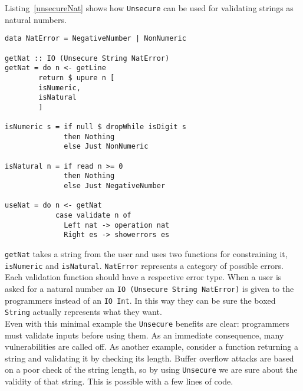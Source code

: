 Listing~\ref{unsecureNat} shows how \texttt{Unsecure} can be used for validating strings as natural numbers.
\begin{lstlisting}[label={unsecureNat}, breaklines=true, caption={Unsecure for natural numbers}]
data NatError = NegativeNumber | NonNumeric

getNat :: IO (Unsecure String NatError)
getNat = do n <- getLine
	    return $ upure n [
		isNumeric,
		isNatural
	    ]	   
	    
isNumeric s = if null $ dropWhile isDigit s
              then Nothing
              else Just NonNumeric

isNatural n = if read n >= 0
              then Nothing
              else Just NegativeNumber
              
useNat = do n <- getNat
            case validate n of
              Left nat -> operation nat
              Right es -> showerrors es
\end{lstlisting}
\texttt{getNat} takes a string from the user and uses two functions for constraining it, \texttt{isNumeric} and \texttt{isNatural}. \texttt{NatError} represents a category of possible errors. Each validation function should have a respective error type. When a user is asked for a natural number an \texttt{IO (Unsecure String NatError)} is given to the programmers instead of an \texttt{IO Int}. In this way they can be sure the boxed \texttt{String} actually represents what they want. \\
Even with this minimal example the \texttt{Unsecure} benefits are clear: programmers must validate inputs before using them. As an immediate consequence, many vulnerabilities are called off. As another example, consider a function returning a string and validating it by checking its length. Buffer overflow attacks are based on a poor check of the string length, so by using \texttt{Unsecure} we are sure about the validity of that string. This is possible with a few lines of code. 